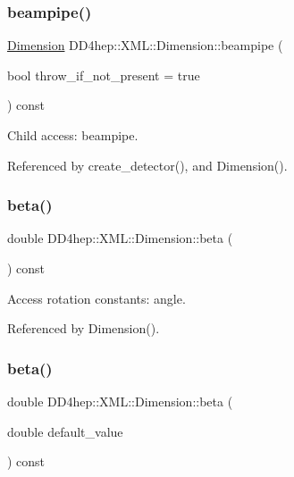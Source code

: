 \subsubsection{\texorpdfstring{beampipe()}{beampipe()}}
{\footnotesize\ttfamily \hyperlink{struct_d_d4hep_1_1_x_m_l_1_1_dimension}{Dimension} D\+D4hep\+::\+X\+M\+L\+::\+Dimension\+::beampipe (\begin{DoxyParamCaption}\item[{bool}]{throw\+\_\+if\+\_\+not\+\_\+present = {\ttfamily true} }\end{DoxyParamCaption}) const}



Child access\+: beampipe. 



Referenced by create\+\_\+detector(), and Dimension().

\hypertarget{struct_d_d4hep_1_1_x_m_l_1_1_dimension_ae6afdb409f273112033a6ed34283506a}{}\label{struct_d_d4hep_1_1_x_m_l_1_1_dimension_ae6afdb409f273112033a6ed34283506a} 
\subsubsection{\texorpdfstring{beta()}{beta()}\hspace{0.1cm}{\footnotesize\ttfamily [1/2]}}
{\footnotesize\ttfamily double D\+D4hep\+::\+X\+M\+L\+::\+Dimension\+::beta (\begin{DoxyParamCaption}{ }\end{DoxyParamCaption}) const}



Access rotation constants\+: angle. 



Referenced by Dimension().

\hypertarget{struct_d_d4hep_1_1_x_m_l_1_1_dimension_ad2b27c1e138de4f3b32ad241e410c443}{}\label{struct_d_d4hep_1_1_x_m_l_1_1_dimension_ad2b27c1e138de4f3b32ad241e410c443} 
\subsubsection{\texorpdfstring{beta()}{beta()}\hspace{0.1cm}{\footnotesize\ttfamily [2/2]}}
{\footnotesize\ttfamily double D\+D4hep\+::\+X\+M\+L\+::\+Dimension\+::beta (\begin{DoxyParamCaption}\item[{double}]{default\+\_\+value }\end{DoxyParamCaption}) const}



